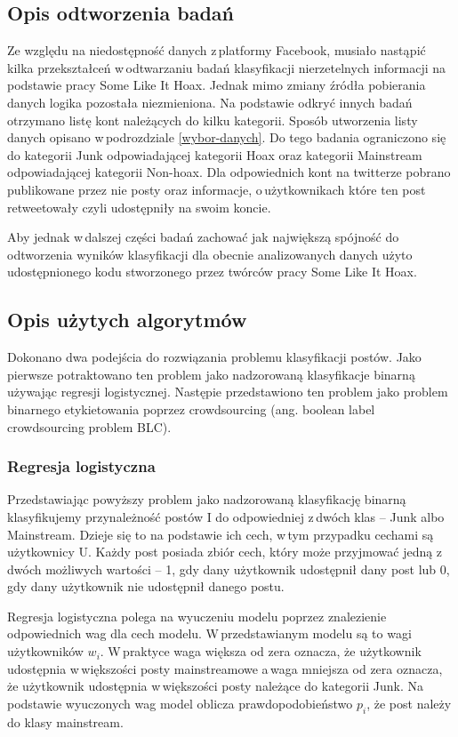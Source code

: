 \subsection{Opis odtworzenia badań }
Ze względu na niedostępność danych z\,platformy Facebook, musiało nastąpić kilka przekształceń w\,odtwarzaniu badań klasyfikacji nierzetelnych informacji na podstawie pracy Some Like It Hoax. Jednak mimo zmiany źródła pobierania danych logika pozostała niezmieniona. Na podstawie odkryć innych badań otrzymano listę kont należących do kilku kategorii. Sposób utworzenia listy danych opisano w\,podrozdziale \ref{wybor-danych}. Do tego badania ograniczono się do kategorii Junk odpowiadającej kategorii Hoax oraz kategorii Mainstream odpowiadającej kategorii Non-hoax. Dla odpowiednich kont na twitterze pobrano publikowane przez nie posty oraz informacje, o\,użytkownikach które ten post retweetowały czyli udostępniły na swoim koncie. 
\par
Aby jednak w\,dalszej części badań zachować jak największą spójność do odtworzenia wyników klasyfikacji dla obecnie analizowanych danych użyto udostępnionego kodu stworzonego przez twórców pracy Some Like It Hoax. 

\subsection{Opis użytych algorytmów }
Dokonano dwa podejścia do rozwiązania problemu klasyfikacji postów. Jako pierwsze potraktowano ten problem jako nadzorowaną klasyfikacje binarną używając regresji logistycznej. Następie przedstawiono ten problem jako problem binarnego etykietowania poprzez crowdsourcing (ang. boolean label crowdsourcing problem BLC). 
\subsubsection{Regresja logistyczna}
Przedstawiając powyższy problem jako nadzorowaną klasyfikację binarną klasyfikujemy przynależność postów I do odpowiedniej z\,dwóch klas – Junk albo Mainstream. Dzieje się to na podstawie ich cech, w\,tym przypadku cechami są użytkownicy U. Każdy post posiada zbiór cech, który może przyjmować jedną z\,dwóch możliwych wartości – 1, gdy dany użytkownik udostępnił dany post lub 0, gdy dany użytkownik nie udostępnił danego postu.
\par
Regresja logistyczna polega na wyuczeniu modelu poprzez znalezienie odpowiednich wag dla cech modelu.  W\,przedstawianym modelu są to wagi użytkowników $w_i$. W\,praktyce waga większa od zera oznacza, że użytkownik udostępnia w\,większości posty mainstreamowe a\,waga mniejsza od zera oznacza, że użytkownik udostępnia w\,większości posty należące do kategorii Junk. Na podstawie wyuczonych wag model oblicza prawdopodobieństwo $p_i$, że post należy do klasy mainstream.

